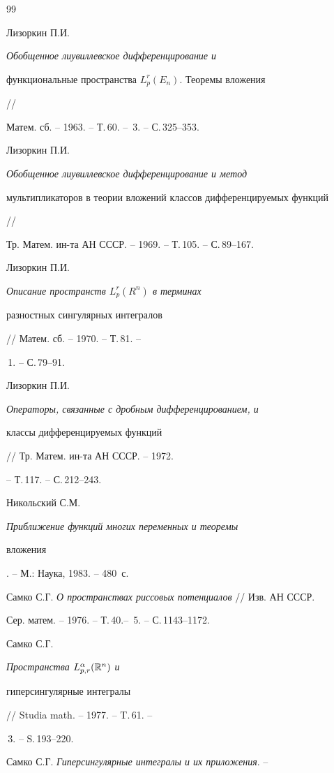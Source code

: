 \begin{thebibliography}{99}







Лизоркин П.И. {\em Обобщенное лиувиллевское дифференцирование и


функциональные пространства $L^r_p(E_n)$. Теоремы вложения} //


Матем. сб. -- 1963. -- Т.\,60. -- \No\,3. -- С.\,325--353.




Лизоркин П.И. {\em Обобщенное лиувиллевское дифференцирование и метод


мультипликаторов в теории вложений классов дифференцируемых функций} //


Тр. Матем. ин-та АН СССР. -- 1969. -- Т.\,105. -- С.\,89--167.




Лизоркин П.И. {\em Описание пространств $L^r_p(R^n)$ в терминах


разностных сингулярных интегралов} // Матем. сб. -- 1970. -- Т.\,81. --


\No\,1. -- С.\,79--91.




Лизоркин П.И. {\em Операторы, связанные с дробным дифференцированием, и


классы дифференцируемых функций} // Тр. Матем. ин-та АН СССР. -- 1972.


-- Т.\,117. -- С.\,212--243.




Никольский С.М. {\em Приближение функций многих переменных и теоремы


вложения}. -- М.: Наука, 1983. -- 480~с.




Самко С.Г. {\em О пространствах риссовых потенциалов} // Изв. АН СССР.


Сер. матем. -- 1976. -- Т.\,40.-- \No\,5. -- С.\,1143--1172.




Самко С.Г. {\em Пространства $L^\alpha_{p,r}(\Bbb R^n)$ и


гиперсингулярные интегралы} // Studia math. -- 1977. -- T.\,61. --


\No\,3. -- S.\,193--220.




Самко С.Г. {\em Гиперсингулярные интегралы и их приложения}. --



\end{thebibliography}
